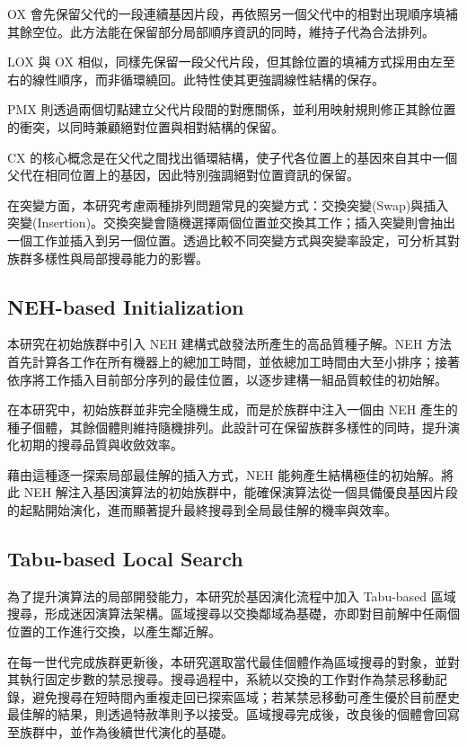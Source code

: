 \documentclass[conference]{IEEEtran}
\begin{document}
OX 會先保留父代的一段連續基因片段，再依照另一個父代中的相對出現順序填補其餘空位。此方法能在保留部分局部順序資訊的同時，維持子代為合法排列。

LOX 與 OX 相似，同樣先保留一段父代片段，但其餘位置的填補方式採用由左至右的線性順序，而非循環繞回。此特性使其更強調線性結構的保存。

PMX 則透過兩個切點建立父代片段間的對應關係，並利用映射規則修正其餘位置的衝突，以同時兼顧絕對位置與相對結構的保留。

CX 的核心概念是在父代之間找出循環結構，使子代各位置上的基因來自其中一個父代在相同位置上的基因，因此特別強調絕對位置資訊的保留。

在突變方面，本研究考慮兩種排列問題常見的突變方式：交換突變(Swap)與插入突變(Insertion)。交換突變會隨機選擇兩個位置並交換其工作；插入突變則會抽出一個工作並插入到另一個位置。透過比較不同突變方式與突變率設定，可分析其對族群多樣性與局部搜尋能力的影響。

\subsection{NEH-based Initialization}
本研究在初始族群中引入 NEH 建構式啟發法所產生的高品質種子解。NEH 方法首先計算各工作在所有機器上的總加工時間，並依總加工時間由大至小排序；接著依序將工作插入目前部分序列的最佳位置，以逐步建構一組品質較佳的初始解。

在本研究中，初始族群並非完全隨機生成，而是於族群中注入一個由 NEH 產生的種子個體，其餘個體則維持隨機排列。此設計可在保留族群多樣性的同時，提升演化初期的搜尋品質與收斂效率。

藉由這種逐一探索局部最佳解的插入方式，NEH 能夠產生結構極佳的初始解。將此 NEH 解注入基因演算法的初始族群中，能確保演算法從一個具備優良基因片段的起點開始演化，進而顯著提升最終搜尋到全局最佳解的機率與效率。

\subsection{Tabu-based Local Search}
為了提升演算法的局部開發能力，本研究於基因演化流程中加入 Tabu-based 區域搜尋，形成迷因演算法架構。區域搜尋以交換鄰域為基礎，亦即對目前解中任兩個位置的工作進行交換，以產生鄰近解。

在每一世代完成族群更新後，本研究選取當代最佳個體作為區域搜尋的對象，並對其執行固定步數的禁忌搜尋。搜尋過程中，系統以交換的工作對作為禁忌移動記錄，避免搜尋在短時間內重複走回已探索區域；若某禁忌移動可產生優於目前歷史最佳解的結果，則透過特赦準則予以接受。區域搜尋完成後，改良後的個體會回寫至族群中，並作為後續世代演化的基礎。
\end{document}
